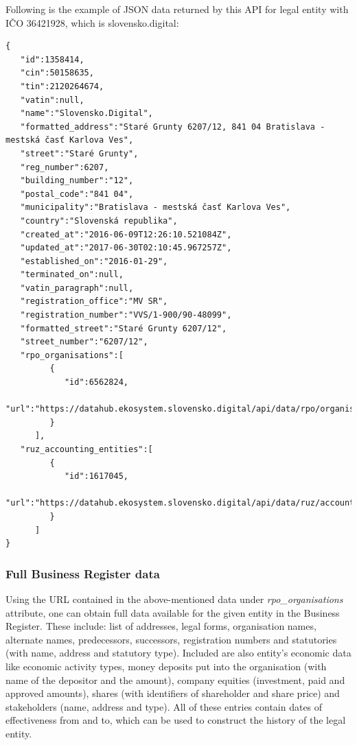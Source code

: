 \documentclass[thesis=B,english]{sprlajur-slovakopendata}[2018/05/12]
\begin{document}
Following is the example of JSON data returned by this API for legal entity with IČO 36421928, which is slovensko.digital:
\newpage
{}
\begin{lstlisting}
{
   "id":1358414,
   "cin":50158635,
   "tin":2120264674,
   "vatin":null,
   "name":"Slovensko.Digital",
   "formatted_address":"Staré Grunty 6207/12, 841 04 Bratislava - mestská časť Karlova Ves",
   "street":"Staré Grunty",
   "reg_number":6207,
   "building_number":"12",
   "postal_code":"841 04",
   "municipality":"Bratislava - mestská časť Karlova Ves",
   "country":"Slovenská republika",
   "created_at":"2016-06-09T12:26:10.521084Z",
   "updated_at":"2017-06-30T02:10:45.967257Z",
   "established_on":"2016-01-29",
   "terminated_on":null,
   "vatin_paragraph":null,
   "registration_office":"MV SR",
   "registration_number":"VVS/1-900/90-48099",
   "formatted_street":"Staré Grunty 6207/12",
   "street_number":"6207/12",
   "rpo_organisations":[
         {
            "id":6562824,
            "url":"https://datahub.ekosystem.slovensko.digital/api/data/rpo/organisations/6562824"
         }
      ],
   "ruz_accounting_entities":[
         {
            "id":1617045,
            "url":"https://datahub.ekosystem.slovensko.digital/api/data/ruz/accounting_entities/1617045"
         }
      ]
}
\end{lstlisting}

\subsubsection{Full Business Register data}
Using the URL contained in the above-mentioned data under \emph{rpo\_organisations} attribute, one can obtain full data available for the given entity in the Business Register. These include: list of addresses, legal forms, organisation names, alternate names, predecessors, successors, registration numbers and statutories (with name, address and statutory type). Included are also entity's economic data like economic activity types, money deposits put into the organisation (with name of the depositor and the amount), company equities (investment, paid and approved amounts), shares (with identifiers of shareholder and share price) and stakeholders (name, address and type). All of these entries contain dates of effectiveness from and to, which can be used to construct the history of the legal entity.
\end{document}
